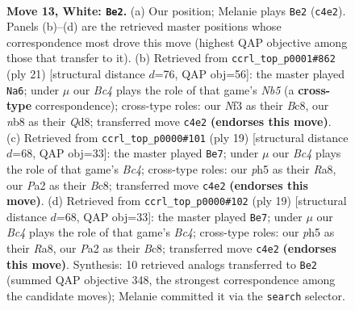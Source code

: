 \documentclass[11pt]{article}
\begin{document}
\clearpage

\begin{figure}[p]\centering
\begin{subfigure}{0.46\textwidth}\centering
\resizebox{\linewidth}{!}{%
\newchessgame
\chessboard[
  setfen={rnbqr1k1/1p3pp1/4pn2/p6p/2BP4/B1P2N2/P2Q1PPP/R4RK1 w - - 2 13},
  showmover=false,
  pgfstyle=straightmove, color=movearrow, markmove={c4-e2}
]}
\caption{}
\end{subfigure}\hfill
\begin{subfigure}{0.46\textwidth}\centering
\resizebox{\linewidth}{!}{%
\newchessgame
\chessboard[
  setfen={r1bq1rk1/1p3ppp/5n2/p1Pp4/1n6/5NP1/PP2PPBP/RN1QK2R b KQ - 1 11},
  showmover=false,
  pgfstyle=straightmove, color=movearrow, markmove={b4-a6}
]}
\caption{}
\end{subfigure}
\\[4pt]
\begin{subfigure}{0.46\textwidth}\centering
\resizebox{\linewidth}{!}{%
\newchessgame
\chessboard[
  setfen={r1bq1rk1/pp3ppp/2n2n2/2bp4/N7/5NP1/PP2PPBP/R1BQ1RK1 b - - 1 10},
  showmover=false,
  pgfstyle=straightmove, color=movearrow, markmove={c5-e7}
]}
\caption{}
\end{subfigure}\hfill
\begin{subfigure}{0.46\textwidth}\centering
\resizebox{\linewidth}{!}{%
\newchessgame
\chessboard[
  setfen={r1bq1rk1/pp3ppp/2n2n2/2bp4/N7/5NP1/PP2PPBP/R1BQ1RK1 b - - 1 10},
  showmover=false,
  pgfstyle=straightmove, color=movearrow, markmove={c5-e7}
]}
\caption{}
\end{subfigure}
\caption{\textbf{Move 13, White: \texttt{Be2}.} (a) Our position; Melanie plays \texttt{Be2} (\texttt{c4e2}). Panels (b)--(d) are the retrieved master positions whose correspondence most drove this move (highest QAP objective among those that transfer to it). (b) Retrieved from \texttt{ccrl\_top\_p0001\#862} (ply 21) [structural distance $d$=76, QAP obj=56]: the master played \texttt{Na6}; under $\mu$ our \emph{Bc4} plays the role of that game's \emph{Nb5} (a \textbf{cross-type} correspondence); cross-type roles: our \emph{N}f3 as their \emph{B}c8, our \emph{n}b8 as their \emph{Q}d8; transferred move \texttt{c4e2} \textbf{(endorses this move)}. (c) Retrieved from \texttt{ccrl\_top\_p0000\#101} (ply 19) [structural distance $d$=68, QAP obj=33]: the master played \texttt{Be7}; under $\mu$ our \emph{Bc4} plays the role of that game's \emph{Bc4}; cross-type roles: our \emph{p}h5 as their \emph{R}a8, our \emph{P}a2 as their \emph{B}c8; transferred move \texttt{c4e2} \textbf{(endorses this move)}. (d) Retrieved from \texttt{ccrl\_top\_p0000\#102} (ply 19) [structural distance $d$=68, QAP obj=33]: the master played \texttt{Be7}; under $\mu$ our \emph{Bc4} plays the role of that game's \emph{Bc4}; cross-type roles: our \emph{p}h5 as their \emph{R}a8, our \emph{P}a2 as their \emph{B}c8; transferred move \texttt{c4e2} \textbf{(endorses this move)}. Synthesis: 10 retrieved analogs transferred to \texttt{Be2} (summed QAP objective 348, the strongest correspondence among the candidate moves); Melanie committed it via the \texttt{search} selector.}
\label{fig:thought-m24}
\end{figure}
\end{document}
